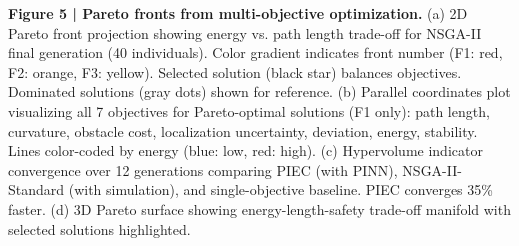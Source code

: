 \documentclass[pdflatex,sn-nature]{sn-jnl}%
\begin{document}
\textbf{Figure 5 | Pareto fronts from multi-objective optimization.} (a) 2D Pareto front projection showing energy vs. path length trade-off for NSGA-II final generation (40 individuals). Color gradient indicates front number (F1: red, F2: orange, F3: yellow). Selected solution (black star) balances objectives. Dominated solutions (gray dots) shown for reference. (b) Parallel coordinates plot visualizing all 7 objectives for Pareto-optimal solutions (F1 only): path length, curvature, obstacle cost, localization uncertainty, deviation, energy, stability. Lines color-coded by energy (blue: low, red: high). (c) Hypervolume indicator convergence over 12 generations comparing PIEC (with PINN), NSGA-II-Standard (with simulation), and single-objective baseline. PIEC converges 35\% faster. (d) 3D Pareto surface showing energy-length-safety trade-off manifold with selected solutions highlighted.
\end{document}
